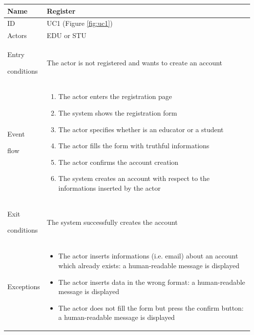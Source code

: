 \begin{center}
    \def\arraystretch{1.5}
    \begin{tabular}{| m{2cm} | m{10cm}|}
        \hline
        Name                  & Register                                                                                                                      \\ \hline
        ID                    & UC1 (Figure \ref{fig:uc1})                                                                                                    \\ \hline
        Actors                & EDU or STU                                                                                                                    \\ \hline
        Entry \par conditions & The actor is not registered and wants to create an account                                                                    \\ \hline
        Event \par flow       & \begin{enumerate}
                                    \item The actor enters the registration page
                                    \item The system shows the registration form
                                    \item The actor specifies whether is an educator or a student
                                    \item The actor fills the form with truthful informations
                                    \item The actor confirms the account creation
                                    \item The system creates an account with respect to the informations inserted by the actor
                                \end{enumerate}                                     \\ \hline
        Exit \par conditions  & The system successfully creates the account                                                                                   \\ \hline
        Exceptions            & \begin{itemize}
                                    \item The actor inserts informations (i.e. email) about an account which already exists: a human-readable message is displayed
                                    \item The actor inserts data in the wrong format: a human-readable message is displayed
                                    \item The actor does not fill the form but press the confirm button: a human-readable message is displayed
                                \end{itemize} \\ \hline
    \end{tabular}
\end{center}

